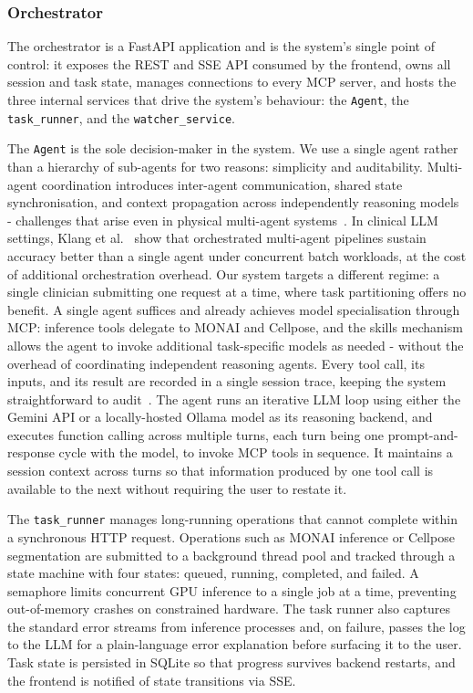 \documentclass[conference]{IEEEtran}
\begin{document}
\subsubsection*{Orchestrator}
The orchestrator is a FastAPI application and is the system's single
point of control: it exposes the REST and SSE API consumed by the
frontend, owns all session and task state, manages connections to every
MCP server, and hosts the three internal services that drive the
system's behaviour: the \texttt{Agent}, the
\texttt{task\_runner}, and the \texttt{watcher\_service}.

The \texttt{Agent} is the sole decision-maker in the system.
We use a single agent rather than a hierarchy of sub-agents for two reasons: simplicity and auditability.
Multi-agent coordination introduces inter-agent communication, shared state synchronisation, and context propagation across independently reasoning models - challenges that arise even in physical multi-agent systems~\cite{abro2024uav}. In clinical LLM settings, Klang et al.~\cite{klang2026orchestrated} show that orchestrated multi-agent pipelines sustain accuracy better than a single agent under concurrent batch workloads, at the cost of additional orchestration overhead. Our system targets a different regime: a single clinician submitting one request at a time, where task partitioning offers no benefit. A single agent suffices and already achieves model specialisation through MCP: inference tools delegate to MONAI and Cellpose, and the skills mechanism allows the agent to invoke additional task-specific models as needed - without the overhead of coordinating independent reasoning agents. Every tool call, its inputs, and its result are recorded in a single session trace, keeping the system straightforward to audit~\cite{collaco2026scoping}.
The agent runs an iterative LLM loop
using either the Gemini API or a locally-hosted Ollama model as its
reasoning backend, and executes function calling across multiple turns, each turn being one prompt-and-response cycle with the model, to invoke
MCP tools in sequence. It maintains a session context across turns so
that information produced by one tool call is available to the next
without requiring the user to restate it.

The \texttt{task\_runner} manages long-running operations that cannot
complete within a synchronous HTTP request. Operations such as MONAI
inference or Cellpose segmentation are submitted to a background thread
pool and tracked through a state machine with four states: queued,
running, completed, and failed.
A semaphore limits concurrent GPU
inference to a single job at a time, preventing out-of-memory crashes
on constrained hardware.
The task runner also captures the standard error streams
from inference processes and, on failure, passes the log to the LLM
for a plain-language error explanation before surfacing it to the user.
Task state is persisted in SQLite so that progress survives backend
restarts, and the frontend is notified of state transitions via SSE\@.
\end{document}
